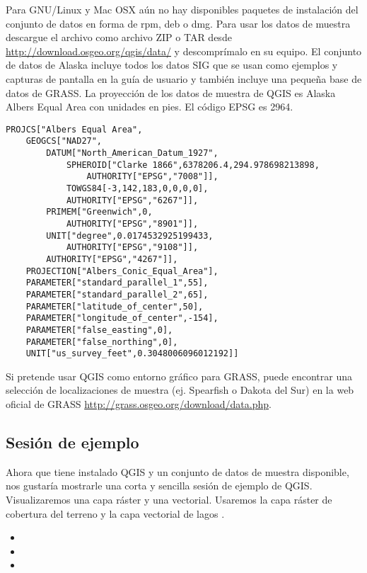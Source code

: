 \nix \osx Para GNU/Linux y Mac OSX aún no hay disponibles paquetes de instalación 
del conjunto de datos en forma de rpm, deb o dmg. Para usar los datos de muestra
descargue el archivo  como archivo ZIP o TAR desde
\url{http://download.osgeo.org/qgis/data/} y descomprímalo en su equipo.
El conjunto de datos de Alaska incluye todos los datos SIG que se usan como
ejemplos y capturas de pantalla en la guía de usuario y también incluye una pequeña
base de datos de GRASS. La proyección de los datos de muestra de QGIS es Alaska Albers Equal
Area con unidades en pies. El código EPSG es 2964.

\begin{verbatim}
PROJCS["Albers Equal Area",
    GEOGCS["NAD27",
        DATUM["North_American_Datum_1927",
            SPHEROID["Clarke 1866",6378206.4,294.978698213898,
                AUTHORITY["EPSG","7008"]],
            TOWGS84[-3,142,183,0,0,0,0],
            AUTHORITY["EPSG","6267"]],
        PRIMEM["Greenwich",0,
            AUTHORITY["EPSG","8901"]],
        UNIT["degree",0.0174532925199433,
            AUTHORITY["EPSG","9108"]],
        AUTHORITY["EPSG","4267"]],
    PROJECTION["Albers_Conic_Equal_Area"],
    PARAMETER["standard_parallel_1",55],
    PARAMETER["standard_parallel_2",65],
    PARAMETER["latitude_of_center",50],
    PARAMETER["longitude_of_center",-154],
    PARAMETER["false_easting",0],
    PARAMETER["false_northing",0],
    UNIT["us_survey_feet",0.3048006096012192]]
\end{verbatim}

Si pretende usar QGIS como entorno gráfico para GRASS, puede encontrar una
selección de localizaciones de muestra (ej. Spearfish o Dakota del Sur) en la web
oficial de GRASS \url{http://grass.osgeo.org/download/data.php}.

\subsection{Sesión de ejemplo}\label{samplesession}

Ahora que tiene instalado QGIS y un conjunto de datos de muestra disponible, nos gustaría 
mostrarle una corta y sencilla sesión de ejemplo de QGIS. Visualizaremos una capa 
ráster y una vectorial. Usaremos la capa ráster de cobertura del terreno 
 y la capa vectorial de lagos 
.


\begin{itemize}
\item {}
\item {}
\item {}
\end{itemize} 

